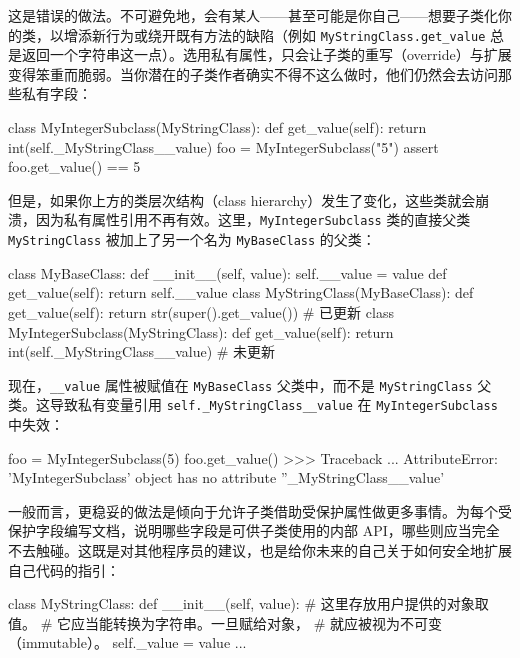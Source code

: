 这是错误的做法。不可避免地，会有某人——甚至可能是你自己——想要子类化你的类，以增添新行为或绕开既有方法的缺陷（例如 \texttt{MyStringClass.get\_value} 总是返回一个字符串这一点）。选用私有属性，只会让子类的重写（override）与扩展变得笨重而脆弱。当你潜在的子类作者确实不得不这么做时，他们仍然会去访问那些私有字段：

\begin{codebox}[python]
class MyIntegerSubclass(MyStringClass):
    def get_value(self):
        return int(self._MyStringClass__value)
foo = MyIntegerSubclass("5")
assert foo.get_value() == 5
\end{codebox}

但是，如果你上方的类层次结构（class hierarchy）发生了变化，这些类就会崩溃，因为私有属性引用不再有效。这里，\texttt{MyIntegerSubclass} 类的直接父类 \texttt{MyStringClass} 被加上了另一个名为 \texttt{MyBaseClass} 的父类：

\begin{codebox}[python]
class MyBaseClass:
    def __init__(self, value):
        self.__value = value
    def get_value(self):
        return self.__value
class MyStringClass(MyBaseClass):
    def get_value(self):
        return str(super().get_value())         # 已更新
class MyIntegerSubclass(MyStringClass):
    def get_value(self):
        return int(self._MyStringClass__value)  # 未更新
\end{codebox}

现在，\texttt{\_\_value} 属性被赋值在 \texttt{MyBaseClass} 父类中，而不是 \texttt{MyStringClass} 父类。这导致私有变量引用 \texttt{self.\_MyStringClass\_\_value} 在 \texttt{MyIntegerSubclass} 中失效：

\begin{codebox}[python]
foo = MyIntegerSubclass(5)
foo.get_value()
>>>
Traceback ...
AttributeError: 'MyIntegerSubclass' object has no attribute
''_MyStringClass__value'
\end{codebox}

一般而言，更稳妥的做法是倾向于允许子类借助受保护属性做更多事情。为每个受保护字段编写文档，说明哪些字段是可供子类使用的内部 API，哪些则应当完全不去触碰。这既是对其他程序员的建议，也是给你未来的自己关于如何安全地扩展自己代码的指引：

\begin{codebox}[python]
class MyStringClass:
    def __init__(self, value):
        # 这里存放用户提供的对象取值。
        # 它应当能转换为字符串。一旦赋给对象，
        # 就应被视为不可变（immutable）。
        self._value = value
    ...
\end{codebox}

